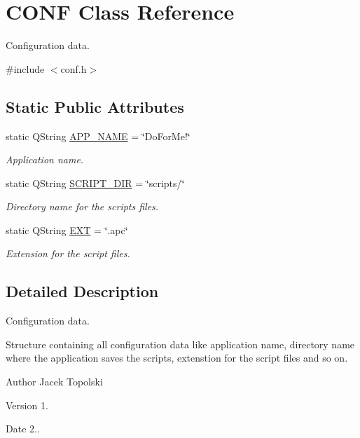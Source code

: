 \hypertarget{struct_c_o_n_f}{\section{C\-O\-N\-F Class Reference}
\label{struct_c_o_n_f}
}


Configuration data.  




{\ttfamily \#include $<$conf.\-h$>$}

\subsection*{Static Public Attributes}
\begin{DoxyCompactItemize}
\item 
static Q\-String \hyperlink{struct_c_o_n_f_a853a9ddc60b4267b40e436f0d990bea0}{A\-P\-P\-\_\-\-N\-A\-M\-E} = \char`\"{}Do\-For\-Me!\char`\"{}
\begin{DoxyCompactList}\small\item\em Application name. \end{DoxyCompactList}\item 
static Q\-String \hyperlink{struct_c_o_n_f_a28e3d7259ab1d7c0415d7e8cf48a76bd}{S\-C\-R\-I\-P\-T\-\_\-\-D\-I\-R} = \char`\"{}scripts/\char`\"{}
\begin{DoxyCompactList}\small\item\em Directory name for the scripts files. \end{DoxyCompactList}\item 
static Q\-String \hyperlink{struct_c_o_n_f_a341328f597b1f2990733b7ac30a8cb88}{E\-X\-T} = \char`\"{}.apc\char`\"{}
\begin{DoxyCompactList}\small\item\em Extension for the script files. \end{DoxyCompactList}\end{DoxyCompactItemize}


\subsection{Detailed Description}
Configuration data. 

Structure containing all configuration data like application name, directory name where the application saves the scripts, extenstion for the script files and so on. \begin{DoxyAuthor}{Author}
Jacek Topolski 
\end{DoxyAuthor}
\begin{DoxyVersion}{Version}
1. 
\end{DoxyVersion}
\begin{DoxyDate}{Date}
2.. 
\end{DoxyDate}


